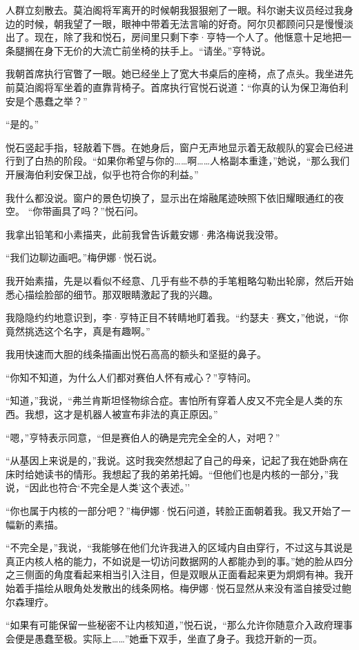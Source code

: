 \documentclass[AutoFakeBold=true]{book}
\begin{document}
人群立刻散去。莫泊阁将军离开的时候朝我狠狠剜了一眼。科尔谢夫议员经过我身边的时候，朝我望了一眼，眼神中带着无法言喻的好奇。阿尔贝都顾问只是慢慢淡出了。现在，除了我和悦石，房间里只剩下李·亨特一个人了。他惬意十足地把一条腿搁在身下无价的大流亡前坐椅的扶手上。``请坐。''亨特说。

我朝首席执行官瞥了一眼。她已经坐上了宽大书桌后的座椅，点了点头。我坐进先前莫泊阁将军坐着的直靠背椅子。首席执行官悦石说道：``你真的认为保卫海伯利安是个愚蠢之举？''

``是的。''

悦石竖起手指，轻敲着下唇。在她身后，窗户无声地显示着无敌舰队的宴会已经进行到了白热的阶段。``如果你希望与你的……啊……人格副本重逢，''她说，``那么我们开展海伯利安保卫战，似乎也符合你的利益。''

我什么都没说。窗户的景色切换了，显示出在熔融尾迹映照下依旧耀眼通红的夜空。 ``你带画具了吗？''悦石问。

我拿出铅笔和小素描夹，此前我曾告诉戴安娜·弗洛梅说我没带。

``我们边聊边画吧。''梅伊娜·悦石说。

我开始素描，先是以看似不经意、几乎有些不恭的手笔粗略勾勒出轮廓，然后开始悉心描绘脸部的细节。那双眼睛激起了我的兴趣。

我隐隐约约地意识到，李·亨特正目不转睛地盯着我。``约瑟夫·赛文，''他说，``你竟然挑选这个名字，真是有趣啊。''

我用快速而大胆的线条描画出悦石高高的额头和坚挺的鼻子。

``你知不知道，为什么人们都对赛伯人怀有戒心？''亨特问。

``知道，''我说，``弗兰肯斯坦怪物综合症。害怕所有穿着人皮又不完全是人类的东西。我想，这才是机器人被宣布非法的真正原因。''

``嗯，''亨特表示同意，``但是赛伯人的确是完完全全的人，对吧？''

``从基因上来说是的，''我说。这时我突然想起了自己的母亲，记起了我在她卧病在床时给她读书的情形。我想起了我的弟弟托姆。``但他们也是内核的一部分，''我说，``因此也符合`不完全是人类'这个表述。''

``你也属于内核的一部分吧？''梅伊娜·悦石问道，转脸正面朝着我。我又开始了一幅新的素描。

``不完全是，''我说，``我能够在他们允许我进入的区域内自由穿行，不过这与其说是真正内核人格的能力，不如说是一切访问数据网的人都能办到的事。''她的脸从四分之三侧面的角度看起来相当引入注目，但是双眼从正面看起来更为炯炯有神。我开始着手描绘从眼角处发散出的线条网格。梅伊娜·悦石显然从来没有滥自接受过鲍尔森理疗。

``如果有可能保留一些秘密不让内核知道，''悦石说，``那么允许你随意介入政府理事会便是愚蠢至极。实际上……''她垂下双手，坐直了身子。我捻开新的一页。
\end{document}
